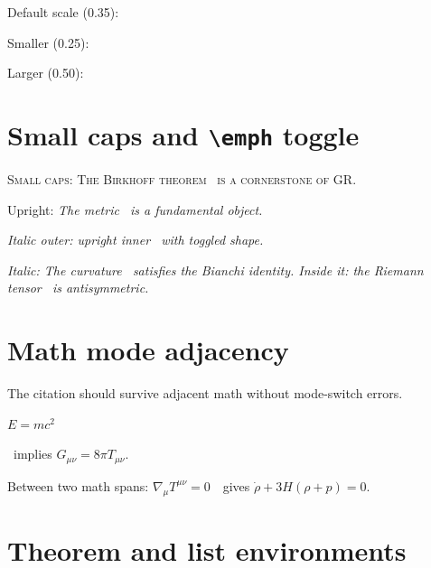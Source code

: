\documentclass[11pt, a4paper]{article}
\begin{document}
\noindent
Default scale (0.35): 

{%
\renewcommand{\citemspscale}{0.25}%
Smaller (0.25): 
}

{%
\renewcommand{\citemspscale}{0.50}%
Larger (0.50): 
}


\section{Small caps and \texttt{\textbackslash emph} toggle}

\noindent
\textsc{Small caps: The Birkhoff theorem~ is a
cornerstone of GR.}

\medskip\noindent
Upright: \emph{The metric~ is a fundamental object.}

\medskip\noindent
\textit{Italic outer: \emph{upright inner~} with
toggled shape.}

\medskip\noindent
\textit{Italic: The curvature~ satisfies the
Bianchi identity. Inside it: \emph{the Riemann
tensor~} is antisymmetric.}


\section{Math mode adjacency}

The citation should survive adjacent math without mode-switch errors.

\medskip\noindent
$E = mc^2$~

\medskip\noindent
{}~implies $G_{\mu\nu} = 8\pi T_{\mu\nu}$.

\medskip\noindent
Between two math spans:
$\nabla_\mu T^{\mu\nu}=0$~~gives
$\dot\rho + 3H(\rho+p)=0$.


\section{Theorem and list environments}
\end{document}
